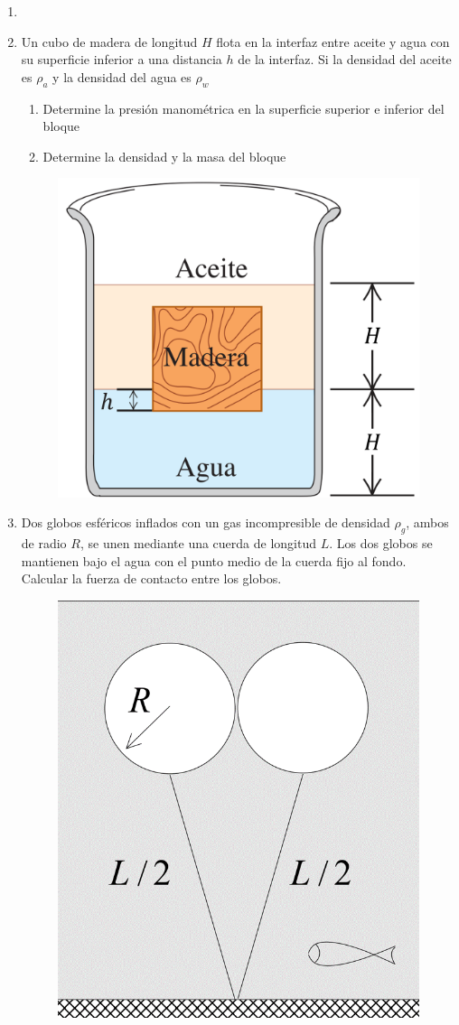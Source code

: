 \documentclass[letterpaper,11pt]{article}
\begin{document}
\vspace{-1cm}
\begin{enumerate}\setlength{\itemsep}{0.4cm}


\item[]

\item
\begin{multicols}{2}
    Un cubo de madera de longitud $H$ flota en la interfaz entre aceite y agua con su superficie inferior a una distancia $h$ de la interfaz. Si la densidad del aceite es $\rho_{a}$ y la densidad del agua es $\rho_{w}$
    
        \begin{enumerate}
            \item Determine la presión manométrica en la superficie superior e inferior del bloque
            \item Determine la densidad y la masa del bloque 
        \end{enumerate}
    
    \columnbreak
    
    \begin{figure}[H]
        \centering
        \includegraphics[width=0.45\linewidth]{2021-2/img/aux14/cubo-madera.png}
    \end{figure}
\end{multicols}

\item
\begin{multicols}{2}
    Dos globos esféricos inflados con un gas incompresible de densidad $\rho_g$, ambos de radio $R$, se unen mediante una cuerda de longitud $L$. Los dos globos se mantienen bajo el agua con el punto medio de la cuerda fijo al fondo. Calcular la fuerza de contacto entre los globos.
    
    \columnbreak
    
    \begin{figure}[H]
        \centering
        \includegraphics[height=0.4\linewidth]{2021-2/img/aux14/globos.png}
    \end{figure}
\end{multicols}


\end{enumerate}
\end{document}
